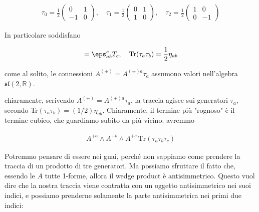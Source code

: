 \documentclass{report}
\begin{document}
\begin{align}
    \tau_0 = \frac{1}{2}\begin{pmatrix}
        0 & 1 \\
        -1 & 0
    \end{pmatrix} , \quad \tau_1 = \frac{1}{2}\begin{pmatrix}
        0 & 1 \\
        1 & 0
    \end{pmatrix} , \quad \tau_2 = \frac{1}{2}\begin{pmatrix}
        1 & 0 \\
        0 & -1
    \end{pmatrix}
\end{align}

In particolare soddisfano 

\begin{align}
    [\tau_a, \tau_b] = \eps_{ab}^cT_c, \quad \text{Tr}(\tau_a\tau_b) = \frac{1}{2}\eta_{ab}
\end{align}

come al solito, le connessioni \(A^{(\pm)} = A^{(\pm)a}\tau_a\) assumono valori nell'algebra \(\mathfrak{sl}(2, \mathbb{R})\). 



chiaramente, scrivendo \(A^{(\pm)} = A^{(\pm)a}\tau_a \), la traccia agisce sui generatori \(\tau_a\), secondo Tr\((\tau_a\tau_b) = (1/2) \eta_{ab}\). Chiaramente, il termine più "rognoso" è il termine cubico, che guardiamo subito da più vicino: avremmo 

\begin{align}
    A^{+a}\wedge A^{+b} \wedge A^{+c} \, \text{Tr}(\tau_a\tau_b\tau_c)
\end{align}

Potremmo pensare di essere nei guai, perché non sappiamo come prendere la traccia di un prodotto di tre generatori. Ma possiamo sfruttare il fatto che, essendo le \(A\) tutte 1-forme, allora il wedge product è antisimmetrico. Questo vuol dire che la nostra traccia viene contratta con un oggetto antisimmetrico nei suoi indici, e possiamo prenderne solamente la parte antisimmetrica nei primi due indici:
\end{document}
